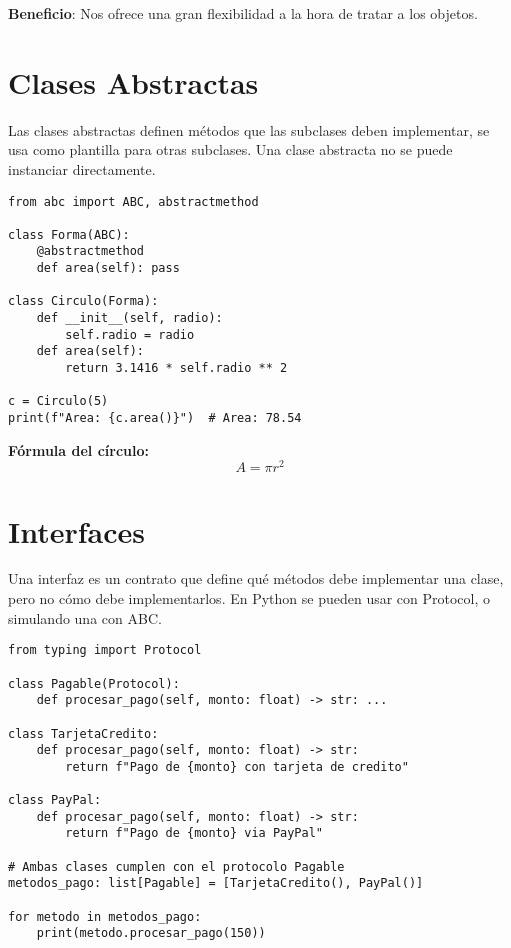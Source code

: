 \documentclass[a4paper,12pt]{article}
\begin{document}
\textbf{Beneficio}: Nos ofrece una gran flexibilidad a la hora de tratar a los objetos.

\section{Clases Abstractas}

Las clases abstractas definen métodos que las subclases deben implementar, se usa como plantilla para otras subclases. Una clase abstracta no se puede instanciar directamente.

\begin{lstlisting}[caption={Clase abstracta con implementación}]
from abc import ABC, abstractmethod

class Forma(ABC):
    @abstractmethod
    def area(self): pass

class Circulo(Forma):
    def __init__(self, radio):
        self.radio = radio
    def area(self):
        return 3.1416 * self.radio ** 2

c = Circulo(5)
print(f"Area: {c.area()}")  # Area: 78.54
\end{lstlisting}

\textbf{Fórmula del círculo:}
\[
A = \pi r^2
\]

\section{Interfaces}

Una interfaz es un contrato que define qué métodos debe implementar una clase, pero no cómo debe implementarlos. En Python se pueden usar con Protocol, o simulando una con ABC.

\begin{lstlisting}[caption={Interfaz para servicios de pago}]
from typing import Protocol

class Pagable(Protocol):
    def procesar_pago(self, monto: float) -> str: ...

class TarjetaCredito:
    def procesar_pago(self, monto: float) -> str:
        return f"Pago de {monto} con tarjeta de credito"

class PayPal:
    def procesar_pago(self, monto: float) -> str:
        return f"Pago de {monto} via PayPal"

# Ambas clases cumplen con el protocolo Pagable
metodos_pago: list[Pagable] = [TarjetaCredito(), PayPal()]

for metodo in metodos_pago:
    print(metodo.procesar_pago(150))
\end{lstlisting}
\end{document}
